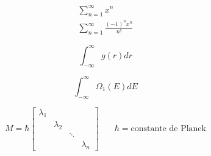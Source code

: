 \documentclass[11pt,leqno]{article}
\begin{document}
\newcommand{\somatorio}[1]{
\sum_{n=1}^{\infty} #1
}
\begin{eqnarray*}
\somatorio{x^{n}} \\
\somatorio{\frac{(-1)^n x^{n}}{n!}}
\end{eqnarray*}

\vspace{2.0cm}

\newcommand{\integralimpropria}[2]{
\begin{equation}
\int_{-\infty}^{\infty}#2(#1)d#1
\nonumber
\end{equation}
}

\integralimpropria{r}{g}

\integralimpropria{E}{\Omega_{1}}

\vspace{2.0cm}

\newcommand{\matriz}[2]{
#1= \hbar \left[
\begin{array}{clcr}
#2_{1} &        &        &        \\
       & #2_{2} &        &        \\
       &        & \ddots &        \\
       &        &        & #2_{n}
\end{array}
\right]
}

\begin{equation}
\matriz{M}{\lambda}  ~~~~~~~~ \hbar = \text{constante de Planck}
\nonumber
\end{equation}
\end{document}
